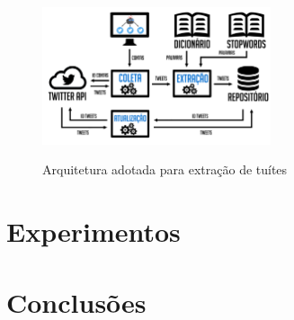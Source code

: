 \documentclass[oneside,openright,12pt]{ufsm_2015} %
\begin{document}
\begin{figure}[ht]
     \caption{Arquitetura adotada para extração de tuítes}
\centering
\includegraphics[width=0.6\textwidth]{figuras/arquitetura.png}
\vspace{\baselineskip} %
\label{fig:arquitetura}
\end{figure}


\chapter{Experimentos}
\label{sec:experimentos}


\chapter{Conclusões}
\label{sec:conclusao}





	
\end{document}
